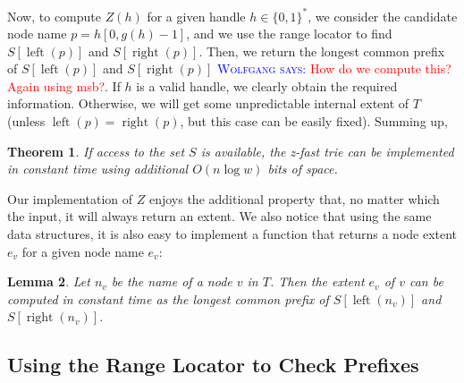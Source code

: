 \documentclass[a4paper,11pt]{article}
\newtheorem{theorem} {Theorem}[section]
\newtheorem{lemma}[theorem]{Lemma}
\newcommand{\?}{\mskip1.5mu}
\DeclareMathOperator{\lrange}{left}
\DeclareMathOperator{\rrange}{right}
\newcommand{\aremark}[3]{\textcolor{blue}{\textsc{#1 #2:}}
  \textcolor{red}{\textsf{#3}}}
\newcommand{\wolfgang}[2][says]{\aremark{Wolfgang}{#1}{#2}}
\begin{document}
Now, to compute $Z(h)$ for a given handle $h \in \{0, 1\}^*$, we
consider the candidate node name $p = h[0, g(h) - 1]$, and we 
use the range locator to find $S[\lrange(p)]$ and $S[\rrange(p)]$.
Then, we return the longest common prefix of $S[\lrange(p)]$ and 
$S[\rrange(p)]$ \wolfgang{How do we compute this? Again using msb?}.  
If $h$ is a valid handle, we clearly obtain the required information. 
Otherwise, we will get some unpredictable internal extent of $T$
(unless $\lrange(p)=\rrange(p)$, but this
case can be easily fixed). Summing up,
\begin{theorem}
\label{th:zfast}
If access to the set $S$ is available, the z-fast trie can be
implemented in constant time using additional $O(n\log w)$ bits of space.
\end{theorem}
Our implementation of $Z$ enjoys the additional property that, no 
matter which the input, it will always return an extent.
We also notice that using the same data structures, it is also easy 
to implement a function that returns a node extent $e_v$ for a given 
node name $e_v$:
\begin{lemma}\label{lem:extent}
Let $n_v$ be the name of a node $v$ in $T$. Then the extent $e_v$
of $v$ can be computed in constant time as the longest common 
prefix of $S[\lrange(n_v)]$ and $S[\rrange(n_v)]$.
\end{lemma}

\subsection{Using the Range Locator to Check Prefixes}
\end{document}
